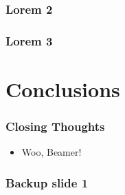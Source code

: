\documentclass[xcolor={table}]{beamer}
\begin{document}
		\begin{frame}
			\frametitle{Lorem 2}
		\end{frame}

		\begin{frame}
			\frametitle{Lorem 3}
		\end{frame}

	\section{Conclusions}
		\begin{frame}
			\frametitle{Closing Thoughts}
			\begin{itemize}
				\item Woo, Beamer!
			\end{itemize}
		\end{frame}
	
	\appendix

	\backupbegin
	  \begin{frame}
	    \frametitle{Backup slide 1}
	  \end{frame}
	\backupend
\end{document}
